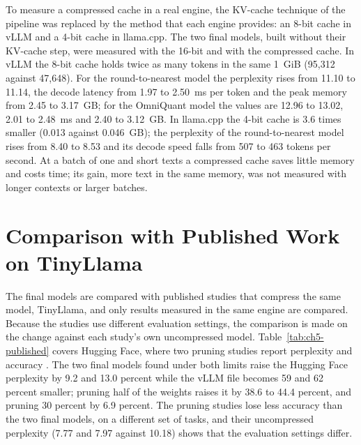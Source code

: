 \documentclass[
11pt, %
english, %
singlespacing, %
headsepline, %
]{MastersDoctoralThesis} %
\begin{document}
To measure a compressed cache in a real engine, the KV-cache technique of the pipeline was replaced by the method that each engine provides: an 8-bit cache in vLLM and a 4-bit cache in llama.cpp. The two final models, built without their KV-cache step, were measured with the 16-bit and with the compressed cache. In vLLM the 8-bit cache holds twice as many tokens in the same 1~GiB (95{,}312 against 47{,}648). For the round-to-nearest model the perplexity rises from 11.10 to 11.14, the decode latency from 1.97 to 2.50~ms per token and the peak memory from 2.45 to 3.17~GB; for the OmniQuant model the values are 12.96 to 13.02, 2.01 to 2.48~ms and 2.40 to 3.12~GB. In llama.cpp the 4-bit cache is 3.6 times smaller (0.013 against 0.046~GB); the perplexity of the round-to-nearest model rises from 8.40 to 8.53 and its decode speed falls from 507 to 463 tokens per second. At a batch of one and short texts a compressed cache saves little memory and costs time; its gain, more text in the same memory, was not measured with longer contexts or larger batches.

\section{Comparison with Published Work on TinyLlama}
\label{sec:ch5-published}

The final models are compared with published studies that compress the same model, TinyLlama, and only results measured in the same engine are compared. Because the studies use different evaluation settings, the comparison is made on the change against each study's own uncompressed model. Table~\ref{tab:ch5-published} covers Hugging Face, where two pruning studies report perplexity and accuracy \cite{ilin2026qkwanda, ilin2025thanos}. The two final models found under both limits raise the Hugging Face perplexity by 9.2 and 13.0 percent while the vLLM file becomes 59 and 62 percent smaller; pruning half of the weights raises it by 38.6 to 44.4 percent, and pruning 30 percent by 6.9 percent. The pruning studies lose less accuracy than the two final models, on a different set of tasks, and their uncompressed perplexity (7.77 and 7.97 against 10.18) shows that the evaluation settings differ.
\end{document}
